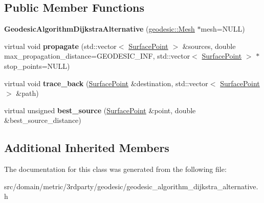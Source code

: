 \subsection*{Public Member Functions}
\begin{DoxyCompactItemize}
\item 
\hypertarget{classgeodesic_1_1_geodesic_algorithm_dijkstra_alternative_ae9b9ec8a3dc5a917a871ba74644d6fdc}{}{\bfseries Geodesic\+Algorithm\+Dijkstra\+Alternative} (\hyperlink{classgeodesic_1_1_mesh}{geodesic\+::\+Mesh} $\ast$mesh=N\+U\+L\+L)\label{classgeodesic_1_1_geodesic_algorithm_dijkstra_alternative_ae9b9ec8a3dc5a917a871ba74644d6fdc}

\item 
\hypertarget{classgeodesic_1_1_geodesic_algorithm_dijkstra_alternative_a0e20601049f263d0585311df5faef16f}{}virtual void {\bfseries propagate} (std\+::vector$<$ \hyperlink{classgeodesic_1_1_surface_point}{Surface\+Point} $>$ \&sources, double max\+\_\+propagation\+\_\+distance=G\+E\+O\+D\+E\+S\+I\+C\+\_\+\+I\+N\+F, std\+::vector$<$ \hyperlink{classgeodesic_1_1_surface_point}{Surface\+Point} $>$ $\ast$stop\+\_\+points=N\+U\+L\+L)\label{classgeodesic_1_1_geodesic_algorithm_dijkstra_alternative_a0e20601049f263d0585311df5faef16f}

\item 
\hypertarget{classgeodesic_1_1_geodesic_algorithm_dijkstra_alternative_a2e954bd36a15c007601af006461c34be}{}virtual void {\bfseries trace\+\_\+back} (\hyperlink{classgeodesic_1_1_surface_point}{Surface\+Point} \&destination, std\+::vector$<$ \hyperlink{classgeodesic_1_1_surface_point}{Surface\+Point} $>$ \&path)\label{classgeodesic_1_1_geodesic_algorithm_dijkstra_alternative_a2e954bd36a15c007601af006461c34be}

\item 
\hypertarget{classgeodesic_1_1_geodesic_algorithm_dijkstra_alternative_aaad0321c19c03ccd65cb337247cd524f}{}virtual unsigned {\bfseries best\+\_\+source} (\hyperlink{classgeodesic_1_1_surface_point}{Surface\+Point} \&point, double \&best\+\_\+source\+\_\+distance)\label{classgeodesic_1_1_geodesic_algorithm_dijkstra_alternative_aaad0321c19c03ccd65cb337247cd524f}

\end{DoxyCompactItemize}
\subsection*{Additional Inherited Members}


The documentation for this class was generated from the following file\+:\begin{DoxyCompactItemize}
\item 
src/domain/metric/3rdparty/geodesic/geodesic\+\_\+algorithm\+\_\+dijkstra\+\_\+alternative.\+h\end{DoxyCompactItemize}
